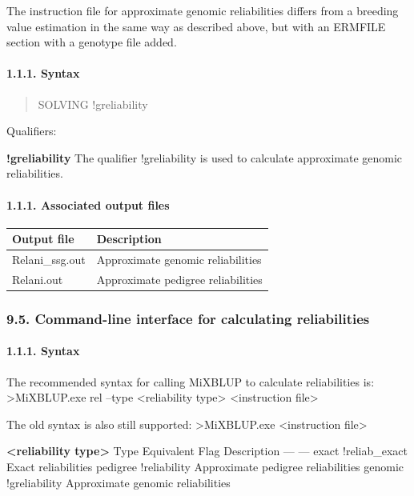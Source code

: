 The instruction file for approximate genomic reliabilities differs from
a breeding value estimation in the same way as described above, but with
an ERMFILE section with a genotype file added.

\paragraph{1.1.1. Syntax}\label{Reli24}

\begin{quote}
SOLVING !greliability
\end{quote}

Qualifiers:

\textbf{!greliability} The qualifier !greliability is used to calculate
approximate genomic reliabilities.

\paragraph{1.1.1. Associated output files}\label{Reli25}

{\def\LTcaptype{none} %
\begin{longtable}[]{@{}ll@{}}
\toprule\noalign{}
Output file & Description \\
\midrule\noalign{}
\endhead
\bottomrule\noalign{}
\endlastfoot
Relani\_ssg.out & Approximate genomic reliabilities \\
Relani.out & Approximate pedigree reliabilities \\
\end{longtable}
}

\subsubsection{9.5. Command-line interface for calculating
reliabilities}\label{Reli26}

\paragraph{1.1.1. Syntax}\label{Reli27}

The recommended syntax for calling MiXBLUP to calculate reliabilities
is: \textgreater MiXBLUP.exe rel --type \textless reliability
type\textgreater{} \textless instruction file\textgreater{}

The old syntax is also still supported: \textgreater MiXBLUP.exe
\textless instruction file\textgreater{}

\textbf{\textless reliability type\textgreater{}} \textbar Type
\textbar{} Equivalent Flag \textbar{} Description\textbar{} \textbar{}
--- \textbar{} --- \textbar{} \textbar exact \textbar{} !reliab\_exact
\textbar{} Exact reliabilities\textbar{} \textbar pedigree \textbar{}
!reliability \textbar{} Approximate pedigree reliabilities\textbar{}
\textbar genomic \textbar{} !greliability \textbar{} Approximate genomic
reliabilities\textbar{}

